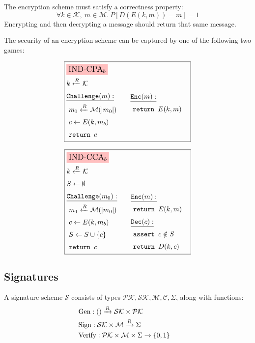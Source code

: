 The encryption scheme must satisfy a correctness property:
$$
\forall k \in \mathcal{K},\ m \in \mathcal{M}.\ P[D(E(k, m)) = m] = 1
$$
Encrypting and then decrypting a message should return that same message.

The security of an encryption scheme can be captured by one of the following
two games:

\begin{game}
\captionsetup{justification=centering}
$$
\boxed{
\begin{aligned}
&\colorbox{pink}{\large $\text{IND-CPA}_b$}\cr
&k \xleftarrow{R} \mathcal{K}\cr
&\begin{aligned}
    &\underline{\texttt{Challenge}(m):}\cr
    &\ m_1 \xleftarrow{R} \mathcal{M}(|m_0|)\cr
    &\ c \gets E(k, m_b)\cr
    &\ \texttt{return } c\cr
\end{aligned}
&\begin{aligned}
    &\underline{\texttt{Enc}(m):}\cr
    &\ \texttt{return } E(k, m)\cr
    &\cr
    &\cr
\end{aligned}\cr
\end{aligned}
}
$$
\caption{$\text{IND-CPA}_b$}
\label{game:ind-cpa}
\end{game}
\begin{game}
\captionsetup{justification=centering}
$$
\boxed{
\begin{aligned}
&\colorbox{pink}{\large $\text{IND-CCA}_b$}\cr
&k \xleftarrow{R} \mathcal{K}\cr
&S \gets \emptyset\cr
&\begin{aligned}
    &\underline{\texttt{Challenge}(m_0):}\cr
    &\ m_1 \xleftarrow{R} \mathcal{M}(|m_0|)\cr
    &\ c \gets E(k, m_b)\cr
    &\ S \gets S \cup \{c\}\cr
    &\ \texttt{return } c\cr
\end{aligned}
&\begin{aligned}
    &\underline{\texttt{Enc}(m):}\cr
    &\ \texttt{return } E(k, m)\cr
    &\underline{\texttt{Dec}(c):}\cr
    &\ \texttt{assert } c \notin S\cr
    &\ \texttt{return } D(k, c)\cr
\end{aligned}\cr
\end{aligned}
}
$$
\caption{$\text{IND-CCA}_b$}
\label{game:ind-cca}
\end{game}

\subsection{Signatures}
A signature scheme $\mathcal{S}$ consists of types $\mathcal{PK}, \mathcal{SK}, \mathcal{M}, \mathcal{C}, \Sigma$,
along with functions:
$$
\begin{aligned}
&\text{Gen} : () \xrightarrow{R} \mathcal{SK} \times \mathcal{PK}\cr
&\text{Sign} : \mathcal{SK} \times \mathcal{M} \xrightarrow{R} \Sigma\cr
&\text{Verify} : \mathcal{PK} \times \mathcal{M} \times \Sigma \to \{0, 1\}\cr
\end{aligned}
$$

